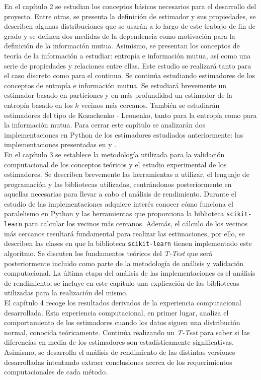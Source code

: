 \documentclass[12pt,a4paper]{report} %
\theoremstyle{definition}
\begin{document}
En el capítulo 2 se estudian los conceptos básicos necesarios para el desarrollo del proyecto. Entre otras, se presenta la definición de estimador y sus propiedades, se describen algunas distribuciones que se usarán a lo largo de este trabajo de fin de grado y se definen dos medidas de la dependencia como motivación para la definición de la información mutua. Asimismo, se presentan los conceptos de teoría de la información a estudiar: entropía e información mutua, así como una serie de propiedades y relaciones entre ellas. Este estudio se realizará tanto para el caso discreto como para el continuo. Se continúa estudiando estimadores de los conceptos de entropía e información mutua. Se estudiará brevemente un estimador basado en particiones y en más profundidad un estimador de la entropía basado en los $k$ vecinos más cercanos. También se estudiarán estimadores del tipo de Kozachenko - Leonenko, tanto para la entropía como para la información mutua. Para cerrar este capítulo se analizarán dos implementaciones en Python de los estimadores estudiados anteriormente: las implementaciones presentadas en \cite{estimating} y \cite{npeet}.\\

En el capítulo 3 se establece la metodología utilizada para la validación computacional de los conceptos teóricos y el estudio experimental de los estimadores. Se describen brevemente las herramientas a utilizar, el lenguaje de programación y las bibliotecas utilizadas, centrándonos posteriormente en aquellas necesarias para llevar a cabo el análisis de rendimiento. Durante el estudio de las implementaciones adquiere interés conocer cómo funciona el paralelismo en Python y las herramientas que proporciona la biblioteca \texttt{scikit-learn} para calcular los vecinos más cercanos. Además, el cálculo de los vecinos más cercanos resultará fundamental para realizar las estimaciones, por ello, se describen las clases en que la biblioteca \texttt{scikit-learn} tienen implementado este algoritmo. Se discuten los fundamentos teóricos del \textit{T-Test} que será posteriormente incluido como parte de la metodología de análisis y validación computacional. La última etapa del análisis de las implementaciones es el análisis de rendimiento, se incluye en este capítulo una explicación de las bibliotecas utilizadas para la realización del mismo.\\

El capítulo 4 recoge los resultados derivados de la experiencia computacional desarrollada. Esta experiencia computacional, en primer lugar, analiza el comportamiento de los estimadores cuando los datos siguen una distribución normal, conocida teóricamente. Continúa realizando un \textit{T-Test} para saber si las diferencias en media de los estimadores son estadísticamente significativas. Asimismo, se desarrolla el análisis de rendimiento de las distintas versiones desarrolladas intentando extraer conclusiones acerca de los requerimientos computacionales de cada método.\\
\end{document}
